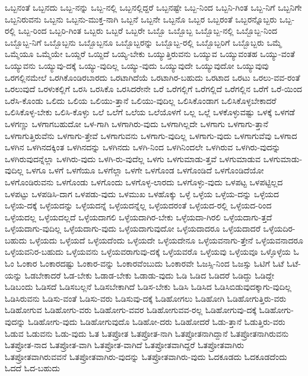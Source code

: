 {ಒಬ್ಬನಂತೆ
ಒಬ್ಬನದು
ಒಬ್ಬ-ನನ್ನು
ಒಬ್ಬ-ನಲ್ಲಿ
ಒಬ್ಬನಲ್ಲಿದ್ದರೆ
ಒಬ್ಬನಷ್ಟೇ
ಒಬ್ಬ-ನಿಂದ
ಒಬ್ಬನಿ-ಗಿಂತ
ಒಬ್ಬ-ನಿಗೆ
ಒಬ್ಬನಿಗೇ
ಒಬ್ಬನಿರುವನು
ಒಬ್ಬನು
ಒಬ್ಬನು-ಮುಕ್ತ-ನಾಗಿ
ಒಬ್ಬನೆ
ಒಬ್ಬನೇ
ಒಬ್ಬನೊ
ಒಬ್ಬರ
ಒಬ್ಬರಂತೆ
ಒಬ್ಬರನ್ನೊಬ್ಬರು
ಒಬ್ಬ-ರಲ್ಲಿ
ಒಬ್ಬ-ರಿಂದ
ಒಬ್ಬರಿ-ಗಿಂತ
ಒಬ್ಬರು
ಒಬ್ಬರೆ
ಒಬ್ಬರೇ
ಒಬ್ಬೊ
ಒಬ್ಬೊಬ್ಬ
ಒಬ್ಬೊಬ್ಬ-ನಲ್ಲಿ
ಒಬ್ಬೊಬ್ಬ-ನಿಂದ
ಒಬ್ಬೊಬ್ಬ-ನಿಗೆ
ಒಬ್ಬೊಬ್ಬನು
ಒಬ್ಬೊಬ್ಬನೂ
ಒಬ್ಬೊಬ್ಬರನ್ನು
ಒಬ್ಬೊಬ್ಬ-ರಲ್ಲಿ
ಒಬ್ಬೊಬ್ಬರಿಗೆ
ಒಬ್ಬೊಬ್ಬರು
ಒಮ್ಮೆ
ಒಮ್ಮೆಯೂ
ಒಮ್ಮೆಯೇ
ಒಯ್ದರೆ
ಒಯ್ದಿದೆ
ಒಯ್ಯ-ಬೇಕು
ಒಯ್ಯುತ್ತಿರುವನು
ಒಯ್ಯುವ
ಒಯ್ಯುವಂತಹ
ಒಯ್ಯು-ವಂತೆ
ಒಯ್ಯುವನು
ಒಯ್ಯುವು-ದಕ್ಕೆ
ಒಯ್ಯು-ವುದಿಲ್ಲ
ಒಯ್ಯು-ವುದು
ಒಯ್ಯುವುದೇ
ಒಯ್ಯುವುದೋ
ಒಯ್ಯುವುವು
ಒರಗಲ್ಲಿನಮೇಲೆ
ಒರಗಿಕೊಂಡಿರಬಾರದು
ಒರಟಾಗಿದೆಯೆ
ಒರಟಾಗಿರ-ಬಹುದು
ಒರಟಾದ
ಒರಟು
ಒರಲು-ವವ-ರಂತೆ
ಒರಲುವುದೆ
ಒರಳುಕಲ್ಲಿಗೆ
ಒರಸಿ
ಒರಸಿಕೊ
ಒರಸಿದರೇನೇ
ಒರೆ
ಒರೆಗಲ್ಲಿಗೆ
ಒರೆಗಲ್ಲಿದೆ
ಒರೆಗಲ್ಲಿನ
ಒರೆಗೆ
ಒರೆ-ಯಿಂದ
ಒರೆಸಿ-ಕೊಂಡು
ಒಲಿದು
ಒಲಿಯ
ಒಲಿಯು-ತ್ತಾನೆ
ಒಲಿಯು-ವುದಿಲ್ಲ
ಒಲಿಸಿಕೊಂಡಾಗ
ಒಲಿಸಿಕೊಳ್ಳಬೇಕಾದರೆ
ಒಲಿಸಿಕೊಳ್ಳ-ಬೇಕು
ಒಲಿಸಿ-ಕೊಳ್ಳು
ಒಲೆ
ಒಲೆಗೆ
ಒಲೆಯ
ಒಲೆಯೊಳಗೆ
ಒಲ್ಲ
ಒಲ್ಲೆ
ಒಳಕೊಳ್ಳುವಷ್ಟು
ಒಳಕ್ಕೆ
ಒಳಗಡೆ
ಒಳಗಣ್ಣು
ಒಳಗಾಗಬಹುದೋ
ಒಳ-ಗಾಗಿ
ಒಳಗಾಗಿರು-ವುದು
ಒಳಗಾಗಿಲ್ಲದೇ
ಒಳಗಾಗು
ಒಳಗಾಗು-ತ್ತಾನೆ
ಒಳಗಾಗುತ್ತಿರುವೆನು
ಒಳಗಾಗು-ತ್ತೇವೆ
ಒಳಗಾಗುವನು
ಒಳಗಾಗು-ವುದಿಲ್ಲ
ಒಳಗಾಗು-ವುದು
ಒಳಗಾಗುವೆವು
ಒಳಗಾದ
ಒಳಗಿನ
ಒಳಗಿನದಕ್ಕಿಂತ
ಒಳಗಿನದನ್ನು
ಒಳಗಿನದು
ಒಳಗಿ-ನಿಂದ
ಒಳಗಿನಿಂದಲೇ
ಒಳಗಿರುವ
ಒಳಗಿರು-ವುದನ್ನು
ಒಳಗಿರುವುದನ್ನೆಲ್ಲಾ
ಒಳಗಿರು-ವುದು
ಒಳಗಿ-ರು-ವುದೆಲ್ಲ
ಒಳಗು
ಒಳಗುಮಾಡು-ತ್ತವೆ
ಒಳಗುಮಾಡುವ
ಒಳಗುಮಾಡು-ವುದಿಲ್ಲ
ಒಳಗೂ
ಒಳಗೆ
ಒಳಗೆಯೂ
ಒಳಗೆಲ್ಲಾ
ಒಳಗೇ
ಒಳಗೊಂಡ
ಒಳಗೊಂಡಿದೆ
ಒಳಗೊಂಡಿದೆಯೋ
ಒಳಗೊಂಡಿರುವನು
ಒಳಗೊಂಡು
ಒಳಗೊಂದು
ಒಳಗೊಳ್ಳ-ಲಾರದು
ಒಳಗೊಳ್ಳು-ವುದು
ಒಳಪಟ್ಟ
ಒಳಪಟ್ಟಿಲ್ಲದ
ಒಳಪಟ್ಟು
ಒಳಪಡಿಸಿ-ದಾಗ
ಒಳಪಡು-ವುದು
ಒಳಮುಖ
ಒಳಹೊಕ್ಕು
ಒಳ್ಳೆ
ಒಳ್ಳೆಯ
ಒಳ್ಳೆಯ-ದನ್ನು
ಒಳ್ಳೆಯದ
ಒಳ್ಳೆಯ-ದಕ್ಕೆ
ಒಳ್ಳೆಯದನ್ನು
ಒಳ್ಳೆಯದನ್ನೆ
ಒಳ್ಳೆಯದನ್ನೆಲ್ಲ
ಒಳ್ಳೆಯದರಂತೆ
ಒಳ್ಳೆಯದ-ರಲ್ಲಿ
ಒಳ್ಳೆಯದ-ರಿಂದ
ಒಳ್ಳೆಯದಲ್ಲ
ಒಳ್ಳೆಯದಲ್ಲದೆ
ಒಳ್ಳೆಯದಾಗಲಿ
ಒಳ್ಳೆಯದಾಗಿರ-ಬೇಕು
ಒಳ್ಳೆಯದಾ-ಗಿರಲಿ
ಒಳ್ಳೆಯದಾಗು-ತ್ತದೆ
ಒಳ್ಳೆಯದಾಗು-ವುದಿಲ್ಲ
ಒಳ್ಳೆಯದಾಗು-ವುದು
ಒಳ್ಳೆಯದಾಗುವುದೋ
ಒಳ್ಳೆಯದಾದರೂ
ಒಳ್ಳೆಯದಾದರೆ
ಒಳ್ಳೆಯದಿರ-ಬಹುದು
ಒಳ್ಳೆಯದು
ಒಳ್ಳೆಯದೆ
ಒಳ್ಳೆಯದೆಂದು
ಒಳ್ಳೆಯದೇ
ಒಳ್ಳೆಯದೇನೂ
ಒಳ್ಳೆಯವನಾಗು-ತ್ತೇನೆ
ಒಳ್ಳೆಯವನಾದರೂ
ಒಳ್ಳೆಯವನಿರ-ಬಹುದು
ಒಳ್ಳೆಯವನು
ಒಳ್ಳೆಯವರಾಗುವು-ದಕ್ಕೆ
ಒಳ್ಳೆಯವರೊ
ಒಳ್ಳೆಯವು
ಒಳ್ಳೆಯವೂ
ಒಳ್ಳೊಳ್ಳೆಯ
ಓ
ಓಂ
ಓಂಕಾರ
ಓಂಕಾರದಷ್ಟು
ಓಂಕಾರ-ವನ್ನು
ಓಂಕಾರವೆಂಬುದು
ಓಂಕಾರವೇ
ಓಜಸ್ಸಿ-ನಿಂದ
ಓಜಸ್ಸು
ಓಟಿಗೆ
ಓಟೆ
ಓಟೆ-ಯನ್ನು
ಓಡಬೇಕಾದರೆ
ಓಡ-ಬೇಕು
ಓಡಾಡ-ಬೇಕು
ಓಡಾಡು-ವುದು
ಓಡಿ
ಓಡಿದ
ಓಡಿದರೆ
ಓಡಿದ್ದು
ಓಡಿದ್ದೇ
ಓಡಿಬಂದು
ಓಡಿಸದೆ
ಓಡಿಸಬಲ್ಲನೆ
ಓಡಿಸಬೇಕಾಗಿದೆ
ಓಡಿಸ-ಬೇಕು
ಓಡಿಸಿ
ಓಡಿಸಿದ
ಓಡಿಸಿಬಿಡುವುದಕ್ಕಾಗು-ವುದಿಲ್ಲ
ಓಡಿಸಿರುವನು
ಓಡಿಸು-ವಂತೆ
ಓಡಿಸು-ವರು
ಓಡಿಸುವು-ದಕ್ಕೆ
ಓಡಿಹೋಗಲು
ಓಡಿಹೋಗಿ
ಓಡಿಹೋಗುತ್ತಿರು-ವರು
ಓಡಿಹೋಗುವ
ಓಡಿಹೋಗು-ವರು
ಓಡಿಹೋಗು-ವವರ
ಓಡಿಹೋಗುವವ-ರಲ್ಲ
ಓಡಿಹೋಗುವು-ದಕ್ಕೆ
ಓಡಿಹೋಗು-ವುದನ್ನು
ಓಡಿಹೋಗು-ವುದು
ಓಡಿಹೋಗುವುದೊ
ಓಡಿಹೋ-ದರು
ಓಡಿಹೋದರೆ
ಓಡು-ತ್ತಾನೆ
ಓಡುತ್ತಿರು-ವರು
ಓಡುವ
ಓಡುವನು
ಓಡು-ವುದು
ಓತ
ಓತಪ್ರೋತ
ಓತಪ್ರೋತ-ನಾಗಿ
ಓತಪ್ರೋತನಾಗಿದ್ದಾನೆ
ಓತಪ್ರೋತನಾಗಿರುವನು
ಓತಪ್ರೋತ-ನಾದ
ಓತಪ್ರೋತ-ವಾಗಿ
ಓತಪ್ರೋತ-ವಾಗಿದೆ
ಓತಪ್ರೋತವಾಗಿದ್ದರೆ
ಓತಪ್ರೋತವಾಗಿರು
ಓತಪ್ರೋತವಾಗಿರುವವನೆ
ಓತಪ್ರೋತವಾಗಿರು-ವುದನ್ನು
ಓತಪ್ರೋತವಾಗಿರು-ವುದು
ಓದಕೂಡದು
ಓದಕೂಡದೆಂದು
ಓದದೆ
ಓದ-ಬಹುದು
}
